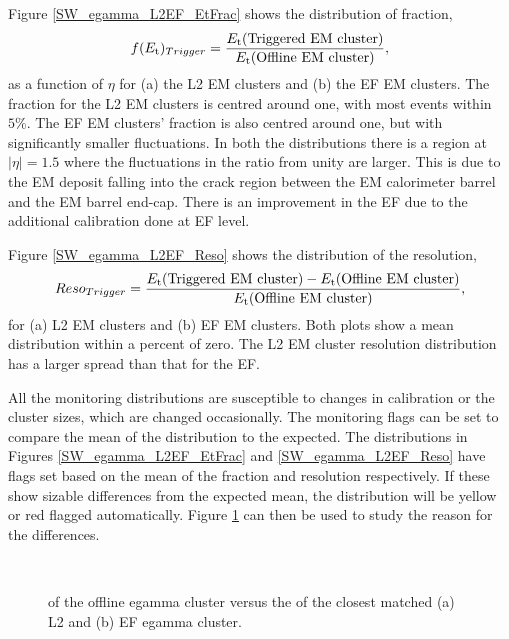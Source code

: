 Figure \ref{SW_egamma_L2EF_EtFrac} shows the distribution of \et{} fraction,
\begin{equation}
f(\mbox{$E_{\rm t}$}{})_{Trigger}=\frac{\mbox{$E_{\rm t}$}{}(\rm{Triggered~EM~cluster})}{\mbox{$E_{\rm t}$}{}(\rm{Offline~EM~cluster})},
\label{SW:EtFrac}
\end{equation}
as a function of $\eta{}$ for (a) the L2 EM clusters and (b) the EF EM clusters.
The \et{} fraction for the L2 EM clusters is centred around one, with most events within $5\%$.
The EF EM clusters' \et{} fraction is also centred around one, but with significantly smaller fluctuations.
In both the distributions there is a region at $|\eta{}|=1.5$ where the fluctuations in the ratio from unity are larger.
This is due to the EM deposit falling into the crack region between the EM calorimeter barrel and the EM barrel end-cap.
There is an improvement in the EF due to the additional calibration done at EF level. 

Figure \ref{SW_egamma_L2EF_Reso} shows the distribution of the \et{} resolution,
\begin{equation}
Reso_{Trigger}=\frac{\mbox{$E_{\rm t}$}{}(\rm{Triggered~EM~cluster})-\mbox{$E_{\rm t}$}{}(\rm{Offline~EM~cluster})}{\mbox{$E_{\rm t}$}{}(\rm{Offline~EM~cluster})},
\label{SW:EtReso}
\end{equation}
for (a) L2 EM clusters and (b) EF EM clusters.
Both plots show a mean \et{} distribution within a percent of zero. 
The L2 EM cluster \et{} resolution distribution has a larger spread than that for the EF.


All the monitoring distributions are susceptible to changes in calibration or the cluster sizes, which are changed occasionally. 
The monitoring flags can be set to compare the mean of the distribution to the expected.
The distributions in Figures \ref{SW_egamma_L2EF_EtFrac} and \ref{SW_egamma_L2EF_Reso} have flags set based on the mean of the \et{} fraction and \et{} resolution respectively. 
If these show sizable differences from the expected mean, the distribution will be yellow or red flagged automatically.
Figure \ref{SW_egamma_L2EF_EtEt} can then be used to study the reason for the differences.

 
\begin{figure}
\centering
\mbox{
   \quad
      \quad
}
\caption[Offline egamma \et{} versus L2 and EF egamma \et{}]{\et{} of the offline egamma cluster versus the \et{} of the closest matched (a) L2 and (b) EF egamma cluster.\label{SW_egamma_L2EF_EtEt}}
\end{figure}

